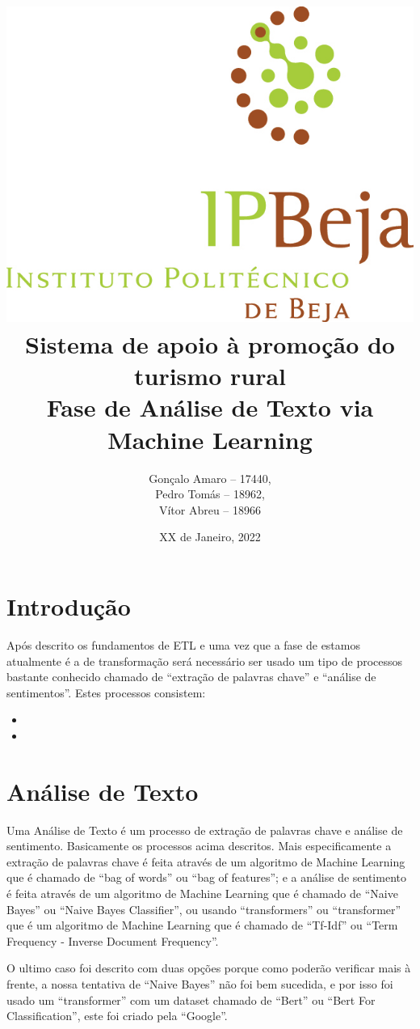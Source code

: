 \documentclass[a4paper,10pt]{article}
\title{\includegraphics[scale=0.5]{ipbeja_logo.png}\\[0.5cm]Sistema de apoio à promoção do turismo rural\\Fase de Análise de Texto via Machine Learning} %
\author{Gonçalo Amaro -- 17440,\\ Pedro Tomás -- 18962,\\ Vítor Abreu -- 18966} %
\date{XX de Janeiro, 2022} %
\def\blankpage{%
      \clearpage%
      \thispagestyle{empty}%
      \addtocounter{page}{-1}%
      \null%
      \clearpage}
\begin{document}


\maketitle

\blankpage{}

{
  \hypersetup{linkcolor=black}
  \tableofcontents
}

\newpage

\section{Introdução}

Após descrito os fundamentos de ETL e uma vez que a fase de estamos atualmente é a de transformação será necessário ser usado um tipo de processos bastante conhecido chamado de ``extração de palavras chave'' e ``análise de sentimentos''.
Estes processos consistem:

\begin{itemize}
  \item {}
  \item {}
\end{itemize}

\section{Análise de Texto}

Uma Análise de Texto é um processo de extração de palavras chave e análise de sentimento. Basicamente os processos acima descritos.
Mais especificamente a extração de palavras chave é feita através de um algoritmo de Machine Learning que é chamado de ``bag of words'' ou ``bag of features''; e a análise de sentimento é feita através de um algoritmo de Machine Learning que é chamado de ``Naive Bayes'' ou ``Naive Bayes Classifier'', ou usando ``transformers'' ou ``transformer'' que é um algoritmo de Machine Learning que é chamado de ``Tf-Idf'' ou ``Term Frequency - Inverse Document Frequency''.

O ultimo caso foi descrito com duas opções porque como poderão verificar mais à frente, a nossa tentativa de ``Naive Bayes'' não foi bem sucedida, e por isso foi usado um ``transformer'' com um dataset chamado de ``Bert'' ou ``Bert For Classification'', este foi criado pela ``Google''.
\end{document}
